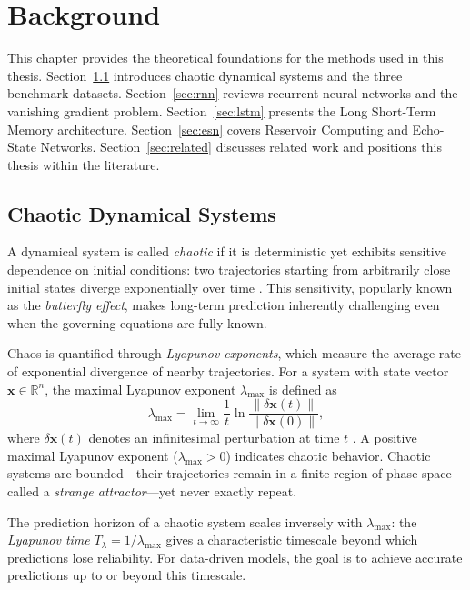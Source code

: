 \section{Background \label{theory}}

This chapter provides the theoretical foundations for the methods used in this thesis.
Section~\ref{sec:chaotic} introduces chaotic dynamical systems and the three benchmark datasets.
Section~\ref{sec:rnn} reviews recurrent neural networks and the vanishing gradient problem.
Section~\ref{sec:lstm} presents the Long Short-Term Memory architecture.
Section~\ref{sec:esn} covers Reservoir Computing and Echo-State Networks.
Section~\ref{sec:related} discusses related work and positions this thesis within the literature.

\subsection{Chaotic Dynamical Systems}
\label{sec:chaotic}

A dynamical system is called \emph{chaotic} if it is deterministic yet exhibits sensitive dependence on initial conditions: two trajectories starting from arbitrarily close initial states diverge exponentially over time \cite{strogatz2018nonlinear}. This sensitivity, popularly known as the \emph{butterfly effect}, makes long-term prediction inherently challenging even when the governing equations are fully known.

Chaos is quantified through \emph{Lyapunov exponents}, which measure the average rate of exponential divergence of nearby trajectories. For a system with state vector $\mathbf{x} \in \mathbb{R}^n$, the maximal Lyapunov exponent $\lambda_{\max}$ is defined as
\begin{equation}
    \lambda_{\max} = \lim_{t \to \infty} \frac{1}{t} \ln \frac{\| \delta\mathbf{x}(t) \|}{\| \delta\mathbf{x}(0) \|},
    \label{eq:lyapunov}
\end{equation}
where $\delta\mathbf{x}(t)$ denotes an infinitesimal perturbation at time $t$ \cite{wolf1985determining}. A positive maximal Lyapunov exponent ($\lambda_{\max} > 0$) indicates chaotic behavior. Chaotic systems are bounded---their trajectories remain in a finite region of phase space called a \emph{strange attractor}---yet never exactly repeat.

The prediction horizon of a chaotic system scales inversely with $\lambda_{\max}$: the \emph{Lyapunov time} $T_\lambda = 1/\lambda_{\max}$ gives a characteristic timescale beyond which predictions lose reliability. For data-driven models, the goal is to achieve accurate predictions up to or beyond this timescale.

